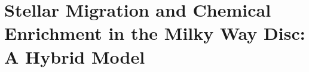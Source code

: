 \documentclass[../main.tex]{subfiles}
\begin{document}
\chapter{Stellar Migration and Chemical Enrichment in the Milky Way Disc: A
Hybrid Model}
\label{migration}





\end{document}
